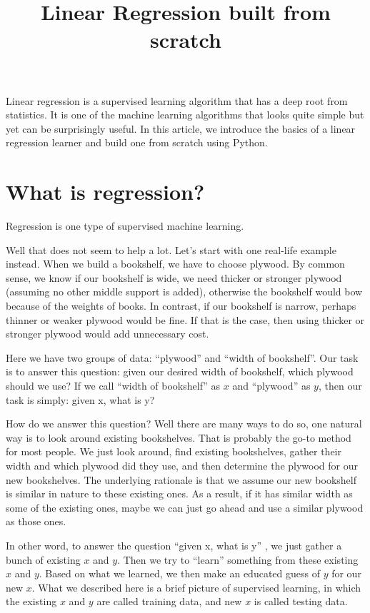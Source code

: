 \documentclass[
	letterpaper
]{article}
\title{Linear Regression built from scratch}
\date{}
\begin{document}
\maketitle
Linear regression is a supervised learning algorithm that has a deep root from statistics. 
It is one of the machine learning algorithms that looks quite simple but yet can be surprisingly useful.
In this article, we introduce the basics of a linear regression learner and build one from scratch using Python.

\section{What is regression?}
Regression is one type of supervised machine learning.

Well that does not seem to help a lot.
Let's start with one real-life example instead.
When we build a bookshelf, we have to choose plywood.
By common sense, we know if our bookshelf is wide, we need thicker or stronger plywood (assuming no other middle support is added), otherwise the bookshelf would bow because of the weights of books.
In contrast, if our bookshelf is narrow, perhaps thinner or weaker plywood would be fine.
If that is the case, then using thicker or stronger plywood would add unnecessary cost.

Here we have two groups of data: ``plywood'' and ``width of bookshelf''.
Our task is to answer this question: given our desired width of bookshelf, which plywood should we use?
If we call ``width of bookshelf'' as $x$ and ``plywood'' as $y$, then our task is simply: given x, what is y?

How do we answer this question? 
Well there are many ways to do so, one natural way is to look around existing bookshelves.
That is probably the go-to method for most people.
We just look around, find existing bookshelves, gather their width and which plywood did they use, and then determine the plywood for our new bookshelves.
The underlying rationale is that we assume our new bookshelf is similar in nature to these existing ones. 
As a result, if it has similar width as some of the existing ones, maybe we can just go ahead and use a similar plywood as those ones.

In other word, to answer the question ``given x, what is y'' , we just gather a bunch of existing $x$ and $y$.
Then we try to ``learn'' something from these existing $x$ and $y$.
Based on what we learned, we then make an educated guess of $y$ for our new $x$.
What we described here is a brief picture of supervised learning, in which the existing $x$ and $y$ are called training data, and new $x$ is called testing data.
\end{document}

